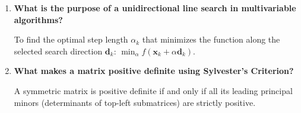 \documentclass[12pt,a4paper]{article}
\newcommand{\Q}[1]{\textbf{#1}\par\noindent\ignorespaces}
\begin{document}
\begin{tcolorbox}[exambox, title={\textbf{Frequently Asked / Viva Questions}}]
\begin{enumerate}[topsep=0pt, label=\textbf{Q\arabic*.}, itemsep=5pt]
  \item \Q{What is the purpose of a unidirectional line search in multivariable algorithms?}
    To find the optimal step length $\alpha_k$ that minimizes the function along the selected search direction $\mathbf{d}_k$: $\min_\alpha f(\mathbf{x}_k + \alpha \mathbf{d}_k)$.
  \item \Q{What makes a matrix positive definite using Sylvester's Criterion?}
    A symmetric matrix is positive definite if and only if all its leading principal minors (determinants of top-left submatrices) are strictly positive.
\end{enumerate}
\end{tcolorbox}
\end{document}
